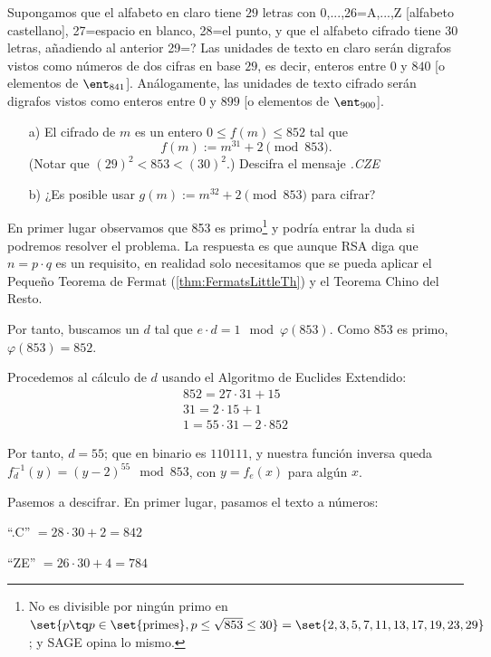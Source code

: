 \begin{problem}[7]
Supongamos que el alfabeto en claro tiene $29$
letras con 0,...,26=A,...,Z [alfabeto castellano], 27=espacio en
blanco, 28=el punto, y que el alfabeto cifrado tiene $30$ letras,
añadiendo al anterior 29=?   Las unidades de texto en claro serán
digrafos vistos como números de dos cifras en base $29$, es decir,
enteros entre $0$ y $840$ [o elementos de $\ent_{841}$].
Análogamente, las unidades de texto cifrado serán digrafos vistos
como enteros entre $0$ y $899$ [o elementos de $\ent_{900}$].
\begin{itemize}
\item[a)]  El cifrado de $m$ es un entero $0\le f(m)\le  852$ tal que
$$f(m):=m^{31}+2 \pmod {853}.$$ (Notar que $(29)^2<853<(30)^2$.)
 Descifra el mensaje {\it .CZE}
\item[b)]  ¿Es posible usar $g(m):=m^{32}+2 \pmod{853}$ para cifrar?
\end{itemize}
\solution
{}

\spart
En primer lugar observamos que 853 es primo\footnote{No es divisible por ningún primo en $\set{p \tq p \in \set{\text{primes}}, p \leq \sqrt{853} \leq 30} = \set{2,3,5,7,11,13,17,19,23,29}$; y SAGE opina lo mismo.} y podría entrar la duda si podremos resolver el problema. La respuesta es que aunque RSA diga que $n = p \cdot q$ es un requisito, en realidad solo necesitamos que se pueda aplicar el Pequeño Teorema de Fermat (\ref{thm:FermatsLittleTh}) y el Teorema Chino del Resto.

Por tanto, buscamos un $d$ tal que $e \cdot d = 1 \mod \varphi(853)$. Como 853 es primo, $\varphi(853) = 852$.

Procedemos al cálculo de $d$ usando el Algoritmo de Euclides Extendido:
\begin{gather*}
852 = 27 \cdot 31 + 15\\
31 = 2 \cdot 15 + 1\\
1 = 55 \cdot 31 - 2 \cdot 852
\end{gather*}

Por tanto, $d = 55$; que en binario es $110111$, y nuestra función inversa queda $f^{-1}_{d}(y) = (y - 2)^{55} \mod 853$, con $y = f_{e}(x)$ para algún $x$.



Pasemos a descifrar. En primer lugar, pasamos el texto a números:

``.C'' $= 28 \cdot 30 + 2 = 842$

``ZE'' $= 26 \cdot 30 + 4 = 784$


\end{problem}
